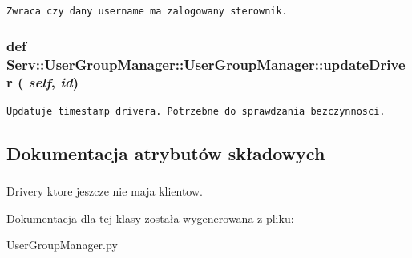 \footnotesize\begin{verbatim}Zwraca czy dany username ma zalogowany sterownik.\end{verbatim}
\normalsize
 \hypertarget{class_serv_1_1_user_group_manager_1_1_user_group_manager_4b8ea748cedc09e0613b3ee7b2674d1a}{
\subsubsection[{updateDriver}]{\setlength{\rightskip}{0pt plus 5cm}def Serv::UserGroupManager::UserGroupManager::updateDriver ( {\em self}, \/   {\em id})}}
\label{class_serv_1_1_user_group_manager_1_1_user_group_manager_4b8ea748cedc09e0613b3ee7b2674d1a}




\footnotesize\begin{verbatim}Updatuje timestamp drivera. Potrzebne do sprawdzania bezczynnosci.\end{verbatim}
\normalsize
 

\subsection{Dokumentacja atrybutów składowych}
\hypertarget{class_serv_1_1_user_group_manager_1_1_user_group_manager_00aa453d586337ce2692166c666a1817}{
\subsubsection[{drivers}]{}}
\label{class_serv_1_1_user_group_manager_1_1_user_group_manager_00aa453d586337ce2692166c666a1817}


Drivery ktore jeszcze nie maja klientow. 



Dokumentacja dla tej klasy została wygenerowana z pliku:\begin{CompactItemize}
\item 
UserGroupManager.py\end{CompactItemize}
